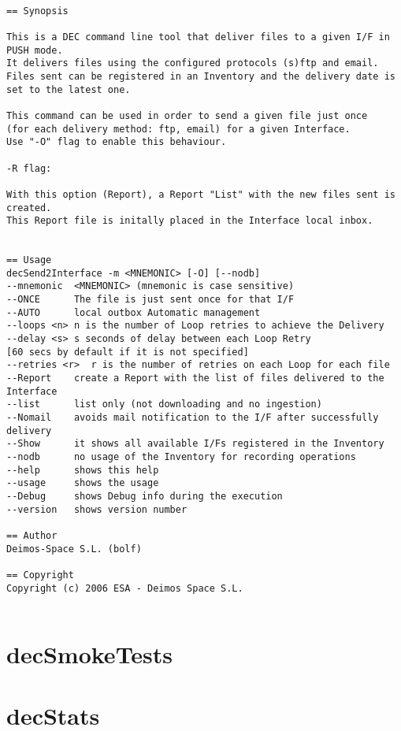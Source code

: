 \documentclass[dec_sum_main.tex]{subfiles}
\begin{document}
\begin{verbatim}

== Synopsis

This is a DEC command line tool that deliver files to a given I/F in PUSH mode.
It delivers files using the configured protocols (s)ftp and email. 
Files sent can be registered in an Inventory and the delivery date is set to the latest one.

This command can be used in order to send a given file just once 
(for each delivery method: ftp, email) for a given Interface. 
Use "-O" flag to enable this behaviour.

-R flag:

With this option (Report), a Report "List" with the new files sent is created. 
This Report file is initally placed in the Interface local inbox.


== Usage
decSend2Interface -m <MNEMONIC> [-O] [--nodb]
--mnemonic  <MNEMONIC> (mnemonic is case sensitive)
--ONCE      The file is just sent once for that I/F
--AUTO      local outbox Automatic management 
--loops <n> n is the number of Loop retries to achieve the Delivery
--delay <s> s seconds of delay between each Loop Retry
[60 secs by default if it is not specified]
--retries <r>  r is the number of retries on each Loop for each file
--Report    create a Report with the list of files delivered to the Interface
--list      list only (not downloading and no ingestion)
--Nomail    avoids mail notification to the I/F after successfully delivery
--Show      it shows all available I/Fs registered in the Inventory
--nodb      no usage of the Inventory for recording operations
--help      shows this help
--usage     shows the usage
--Debug     shows Debug info during the execution
--version   shows version number

== Author
Deimos-Space S.L. (bolf)

== Copyright
Copyright (c) 2006 ESA - Deimos Space S.L.


\end{verbatim}

\section{decSmokeTests}

\label{decStats}
\section{decStats}
\end{document}
